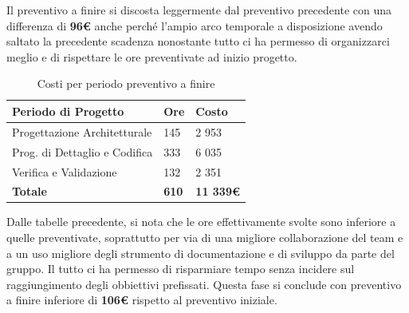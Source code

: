 \documentclass[a4paper,11pt]{article}
\begin{document}
		Il preventivo a finire si discosta leggermente dal preventivo precedente con una differenza di \textbf{96\euro} anche perché l'ampio arco temporale a disposizione avendo saltato la precedente scadenza nonostante tutto ci ha permesso di organizzarci meglio e di rispettare le ore preventivate ad inizio progetto.
		
		\begin{table}[h!]
	\begin{center}
		\begin{tabular}{l l l}
			\textbf{Periodo di Progetto} 	& \textbf{Ore} 	& \textbf{Costo}\\
			\midrule
			Progettazione Architetturale	& 145 			& 2 953 \\
			Prog. di Dettaglio e Codifica 	& 333 			& 6 035 \\
			Verifica e Validazione 			& 132 			& 2 351	\\
			\midrule
			\textbf{Totale} 				&\textbf{610} 	&\textbf{11 339\euro}
		\end{tabular} 
		\end{center}
	\caption{Costi per periodo preventivo a finire}
	\end{table}	
		
		Dalle tabelle precedente, si nota che le ore effettivamente svolte sono inferiore a quelle preventivate, soprattutto per via di una migliore collaborazione del team e a un uso migliore degli strumento di documentazione e di sviluppo da parte del gruppo. Il tutto ci ha permesso di risparmiare tempo senza incidere sul raggiungimento degli obbiettivi prefissati. Questa fase si conclude con preventivo a finire inferiore di \textbf{106\euro} rispetto al preventivo iniziale.
	
			
\end{document}
